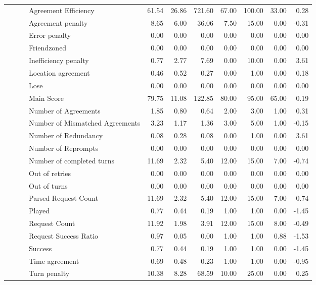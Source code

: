 \begin{tabular}{llllrrrrrrr}
 &  &  & Agreement Efficiency & 61.54 & 26.86 & 721.60 & 67.00 & 100.00 & 33.00 & 0.28 \\
 &  &  & Agreement penalty & 8.65 & 6.00 & 36.06 & 7.50 & 15.00 & 0.00 & -0.31 \\
 &  &  & Error penalty & 0.00 & 0.00 & 0.00 & 0.00 & 0.00 & 0.00 & 0.00 \\
 &  &  & Friendzoned & 0.00 & 0.00 & 0.00 & 0.00 & 0.00 & 0.00 & 0.00 \\
 &  &  & Inefficiency penalty & 0.77 & 2.77 & 7.69 & 0.00 & 10.00 & 0.00 & 3.61 \\
 &  &  & Location agreement & 0.46 & 0.52 & 0.27 & 0.00 & 1.00 & 0.00 & 0.18 \\
 &  &  & Lose & 0.00 & 0.00 & 0.00 & 0.00 & 0.00 & 0.00 & 0.00 \\
 &  &  & Main Score & 79.75 & 11.08 & 122.85 & 80.00 & 95.00 & 65.00 & 0.19 \\
 &  &  & Number of Agreements & 1.85 & 0.80 & 0.64 & 2.00 & 3.00 & 1.00 & 0.31 \\
 &  &  & Number of Mismatched Agreements & 3.23 & 1.17 & 1.36 & 3.00 & 5.00 & 1.00 & -0.15 \\
 &  &  & Number of Redundancy & 0.08 & 0.28 & 0.08 & 0.00 & 1.00 & 0.00 & 3.61 \\
 &  &  & Number of Reprompts & 0.00 & 0.00 & 0.00 & 0.00 & 0.00 & 0.00 & 0.00 \\
 &  &  & Number of completed turns & 11.69 & 2.32 & 5.40 & 12.00 & 15.00 & 7.00 & -0.74 \\
 &  &  & Out of retries & 0.00 & 0.00 & 0.00 & 0.00 & 0.00 & 0.00 & 0.00 \\
 &  &  & Out of turns & 0.00 & 0.00 & 0.00 & 0.00 & 0.00 & 0.00 & 0.00 \\
 &  &  & Parsed Request Count & 11.69 & 2.32 & 5.40 & 12.00 & 15.00 & 7.00 & -0.74 \\
 &  &  & Played & 0.77 & 0.44 & 0.19 & 1.00 & 1.00 & 0.00 & -1.45 \\
 &  &  & Request Count & 11.92 & 1.98 & 3.91 & 12.00 & 15.00 & 8.00 & -0.49 \\
 &  &  & Request Success Ratio & 0.97 & 0.05 & 0.00 & 1.00 & 1.00 & 0.88 & -1.53 \\
 &  &  & Success & 0.77 & 0.44 & 0.19 & 1.00 & 1.00 & 0.00 & -1.45 \\
 &  &  & Time agreement & 0.69 & 0.48 & 0.23 & 1.00 & 1.00 & 0.00 & -0.95 \\
 &  &  & Turn penalty & 10.38 & 8.28 & 68.59 & 10.00 & 25.00 & 0.00 & 0.25 \\

\end{tabular}
